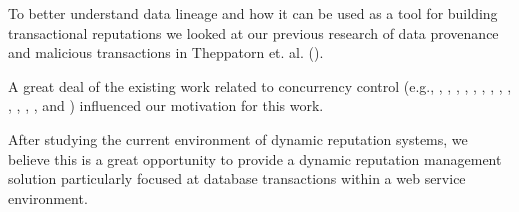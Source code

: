 To better understand data lineage and how it can be used as a tool for building transactional reputations we looked at our previous research of data provenance and malicious transactions in Theppatorn et. al. (\cite{theppatorn_2021}).

A great deal of the existing work related to concurrency control (e.g., \cite{Alrifai_Distributed_Managment}, \cite{Fekete_RAMP}, \cite{dai_qos-driven_2009}, \cite{WSCO}, \cite{ferreira_transactional_2012}, \cite{WSBA}, \cite{zhengdong_gao_combining_2005}, \cite{Fekete_IsolationSupport}, \cite{Fekete_Promises}, \cite{Eunhee_PredictionBasedCC}, \cite{kang-woo_lee_consistency_2000}, \cite{WSAT}, \cite{olmsted_long_2015}, and \cite{Riegen_RuleBased}) influenced our motivation for this work.

After studying the current environment of dynamic reputation systems, we believe this is a great opportunity to provide a dynamic reputation management solution particularly focused at database transactions within a web service environment.